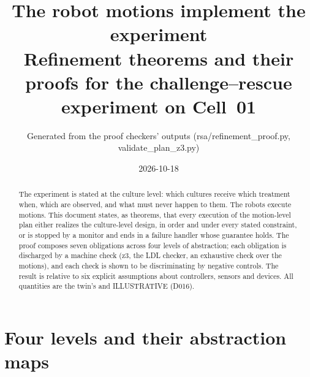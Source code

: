 \documentclass[10pt,a4paper]{article}
\title{\sffamily\bfseries The robot motions implement the experiment\\[4pt]\large Refinement theorems and their proofs for the challenge--rescue experiment on Cell~01}
\author{Generated from the proof checkers' outputs (rsa/refinement\_proof.py, validate\_plan\_z3.py)}
\date{2026-10-18}
\theoremstyle{plain}\newtheorem{theorem}{Theorem}\newtheorem{lemma}{Lemma}\newtheorem{corollary}{Corollary}
\theoremstyle{definition}\newtheorem{definition}{Definition}\newtheorem{assumption}{Assumption}
\theoremstyle{remark}\newtheorem*{remark}{Remark}
\newcommand{\M}{\mathcal{M}}\newcommand{\Pl}{\mathcal{P}}\newcommand{\Lp}{\mathcal{L}}\newcommand{\C}{\mathcal{C}}
\begin{document}
\maketitle
\begin{abstract}
The experiment is stated at the culture level: which cultures receive which treatment when, which are observed, and
what must never happen to them. The robots execute motions. This document states, as theorems, that every execution of
the motion-level plan either realizes the culture-level design, in order and under every stated constraint, or is
stopped by a monitor and ends in a failure handler whose guarantee holds. The proof composes seven obligations across
four levels of abstraction; each obligation is discharged by a machine check (z3, the LDL checker, an exhaustive check
over the motions), and each check is shown to be discriminating by negative controls. The result is relative to six
explicit assumptions about controllers, sensors and devices. All quantities are the twin's and ILLUSTRATIVE (D016).
\end{abstract}

\section{Four levels and their abstraction maps}
\begin{center}\end{center}
\end{document}
